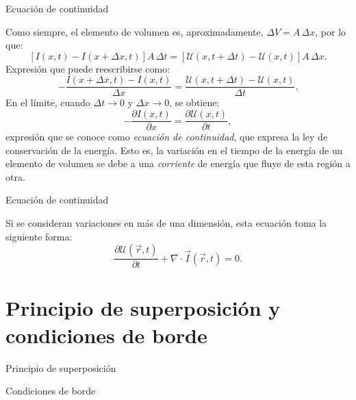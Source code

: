 \documentclass[11pt,handout,aspectratio=1610]{beamer}
\newcommand{\pdiff}[2]{\frac{\partial #1}{\partial #2}}
\begin{document}
\begin{frame}{Ecuación de continuidad}

    Como siempre, el elemento de volumen es, aproximadamente, $\Delta V = A \, \Delta x$, por lo que: $$ \left[I\left(x,t\right) - I \left(x + \Delta x, t\right)\right] A \, \Delta t = \left[\mathcal{U} \left(x,t + \Delta t\right) - \mathcal{U} \left(x,t\right)\right] A \, \Delta x. $$ Expresión que puede reescribirse como: $$ - \frac{I\left(x + \Delta x,t\right) - I \left(x, t\right)}{\Delta x} = \frac{\mathcal{U} \left(x,t + \Delta t\right) - \mathcal{U} \left(x,t\right)}{\Delta t}. $$ En el límite, cuando $\Delta t \to 0 $ y $\Delta x \to 0$, se obtiene: $$ - \pdiff{I\left(x,t\right)}{x} = \pdiff{\mathcal{U} \left(x,t\right)}{t}, $$ expresión que se conoce como \emph{ecuación de continuidad}, que expresa la ley de conservación de la energía. Esto es, la variación en el tiempo de la energía de un elemento de volumen se debe a una \emph{corriente} de energía que fluye de esta región a otra.

\end{frame}

\begin{frame}{Ecuación de continuidad}
    
    Si se consideran variaciones en más de una dimensión, esta ecuación toma la siguiente forma: $$ \pdiff{\mathcal{U} \left(\vec{r},t\right)}{t} + \nabla \cdot \vec{I} \left(\vec{r},t\right) = 0.$$

\end{frame}

\section{Principio de superposición y condiciones de borde}

\begin{frame}{Principio de superposición}



\end{frame}

\begin{frame}{Condiciones de borde}



\end{frame}
\end{document}
